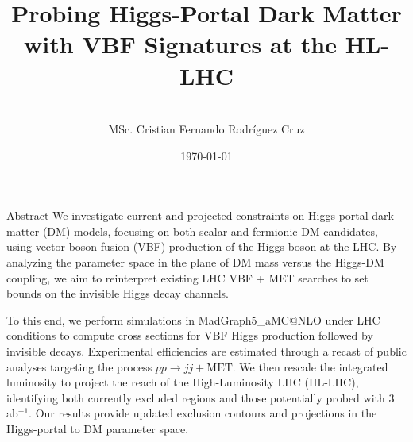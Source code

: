 \documentclass{../../bredelebeamer}
\title[Higgs-Portal DM with VBF at HL-LHC]{Probing Higgs-Portal Dark Matter with VBF Signatures at the HL-LHC}
\subtitle{}
\author[C. Rodríguez]{
	\vspace{2em}\\
	MSc. Cristian Fernando Rodríguez Cruz\inst{1}\\
	\vspace{1em}
}
\institute[Uniandes]{\inst{1} Universidad de los Andes\and
}
\date{\today}
\begin{document}
\begin{frame}
    \titlepage
\end{frame}
\begin{frame}{Abstract}
    \justifying
    We investigate current and projected constraints on Higgs-portal dark matter (DM) models, focusing on both scalar and fermionic DM candidates, using vector boson fusion (VBF) production of the Higgs boson at the LHC. By analyzing the parameter space in the plane of DM mass versus the Higgs-DM coupling, we aim to reinterpret existing LHC VBF + MET searches to set bounds on the invisible Higgs decay channels.

    \vfill

    To this end, we perform simulations in MadGraph5\_aMC@NLO under LHC conditions to compute cross sections for VBF Higgs production followed by invisible decays. Experimental efficiencies are estimated through a recast of public analyses targeting the process $pp \to jj + \text{MET}$. We then rescale the integrated luminosity to project the reach of the High-Luminosity LHC (HL-LHC), identifying both currently excluded regions and those potentially probed with 3 ab$^{-1}$. Our results provide updated exclusion contours and projections in the Higgs-portal to DM parameter space.
\end{frame}


\end{document}
